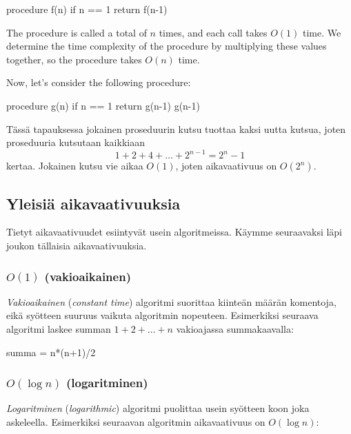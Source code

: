 \begin{code}
    procedure f(n)
    if n == 1
    return
    f(n-1)
\end{code}

The procedure is called a total of $n$ times, and each call takes $O(1)$ time.
We determine the time complexity of the procedure by multiplying these values together,
so the procedure takes $O(n)$ time.

Now, let's consider the following procedure:

\begin{code}
    procedure g(n)
    if n == 1
    return
    g(n-1)
    g(n-1)
\end{code}



Tässä tapauksessa jokainen proseduurin kutsu tuottaa kaksi uutta kutsua,
joten proseduuria kutsutaan kaikkiaan
\[1+2+4+\dots+2^{n-1}=2^n-1\]
kertaa. Jokainen kutsu vie aikaa $O(1)$,
joten aikavaativuus on $O(2^n)$.

\subsection{Yleisiä aikavaativuuksia}

Tietyt aikavaativuudet esiintyvät usein algoritmeissa.
Käymme seuraavaksi läpi joukon tällaisia aikavaativuuksia.


\subsubsection{$O(1)$ (vakioaikainen)}

\emph{Vakioaikainen} (\emph{constant time}) algoritmi suorittaa kiinteän määrän komentoja,
eikä syötteen suuruus vaikuta algoritmin nopeuteen.
Esimerkiksi seuraava algoritmi laskee summan $1+2+\dots+n$
vakioajassa summakaavalla:

\begin{code}
    summa = n*(n+1)/2
\end{code}


\subsubsection{$O(\log n)$ (logaritminen)}

\emph{Logaritminen} (\emph{logarithmic}) algoritmi puolittaa usein syötteen koon
joka askeleella.
Esimerkiksi seuraavan algoritmin aikavaativuus on $O(\log n)$:

